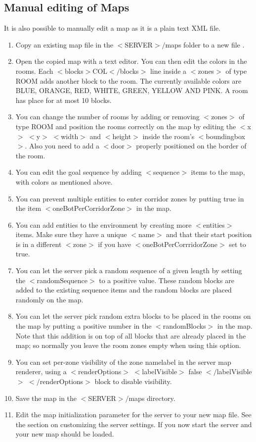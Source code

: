 \subsection{Manual editing of Maps}
It is also possible to manually edit a map as it is a plain text XML file.
\begin{enumerate}
\item Copy an existing map file in the $<$SERVER$>/$maps folder to a new file \footnotemark[1].
\item Open the copied map with a text editor. You can then edit the colors in the rooms. Each $<$blocks$>$COL$</$blocks$>$ line inside a $<$zones$>$ of type ROOM adds another block to the room. The currently available colors are BLUE, ORANGE, RED, WHITE, GREEN, YELLOW AND PINK. A room has place for at most 10 blocks.
\item You can change the number of rooms by adding or removing $<$zones$>$ of type ROOM and position the rooms correctly on the map by editing the $<$x$>$ $<$y$>$ $<$width$>$ and $<$height$>$ inside the room's $<$boundingbox$>$. Also you need to add a $<$door$>$ properly positioned on the border of the room.
\item You can edit the goal sequence by adding $<$sequence$>$ items to the map, with colors as mentioned above.
\item You can prevent multiple entities to enter corridor zones by putting true in the item $<$oneBotPerCorridorZone$>$ in the map.
\item You can add entities to the environment by creating more $<$entities$>$ items. Make sure they have a unique $<$name$>$ and that their start position is in a different $<$zone$>$ if you have $<$oneBotPerCorrridorZone$>$ set to true.
\item You can let the server pick a random sequence of a given length by setting the $<$randomSequence$>$ to a positive value. These random blocks are added to the existing sequence items and the random blocks are placed randomly on the map.
\item You can let the server pick random extra blocks to be placed in the rooms on the map by putting a positive number in the $<$randomBlocks$>$ in the map. Note that this addition is on top of all blocks that are already placed in the map; so normally you leave the room zones empty when using this option.
\item You can set per-zone visibility of the zone namelabel in the server map renderer, using a $<$renderOptions$>$ $<$labelVisible$>$ false $</$labelVisible$>$ $</$renderOptions$>$ block to disable visibility.
\item Save the map in the $<$SERVER$>/$maps directory.
\item Edit the map initialization parameter for the server to your new map file. See the section on customizing the server settings. If you now start the server and your new map should be loaded.
\end{enumerate}


